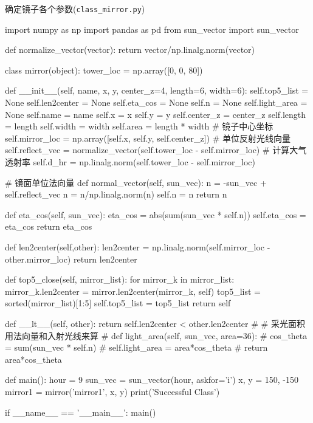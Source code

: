 \documentclass{article}
\numberwithin{equation}{subsection}
\begin{document}
确定镜子各个参数(\verb|class_mirror.py|)
\begin{python}
import numpy as np
import pandas as pd
from sun_vector import sun_vector



def normalize_vector(vector):
    return vector/np.linalg.norm(vector)


class mirror(object):
    tower_loc = np.array([0, 0, 80])

    def __init__(self, name, x, y, center_z=4, length=6, width=6):
        self.top5_list = None
        self.len2center = None
        self.eta_cos = None
        self.n = None
        self.light_area = None
        self.name = name
        self.x = x
        self.y = y
        self.center_z = center_z
        self.length = length
        self.width = width
        self.area = length * width
        # 镜子中心坐标
        self.mirror_loc = np.array([self.x, self.y, self.center_z])
        # 单位反射光线向量
        self.reflect_vec = normalize_vector(self.tower_loc - self.mirror_loc)
        # 计算大气透射率
        self.d_hr = np.linalg.norm(self.tower_loc - self.mirror_loc)

    # 镜面单位法向量
    def normal_vector(self, sun_vec):
        n = -sun_vec + self.reflect_vec
        n = n/np.linalg.norm(n)
        self.n = n
        return n

    def eta_cos(self, sun_vec):
        eta_cos = abs(sum(sun_vec * self.n))
        self.eta_cos = eta_cos
        return eta_cos

    def len2center(self,other):
        len2center = np.linalg.norm(self.mirror_loc - other.mirror_loc)
        return len2center
    
    def top5_close(self, mirror_list):
        for mirror_k in mirror_list:
            mirror_k.len2center = mirror.len2center(mirror_k, self)
        top5_list = sorted(mirror_list)[1:5]
        self.top5_list = top5_list
        return self

    def __lt__(self, other):
        return self.len2center < other.len2center
    # # 采光面积 用法向量和入射光线来算
    # def light_area(self, sun_vec, area=36):
    #     cos_theta = sum(sun_vec * self.n)
    #     self.light_area = area*cos_theta
    #     return area*cos_theta

def main():
    hour = 9
    sun_vec = sun_vector(hour, askfor='i')
    x, y = 150, -150
    mirror1 = mirror('mirror1', x, y)
    print('Successful Class')

if __name__ == '__main__':
    main()


\end{python}
\end{document}
